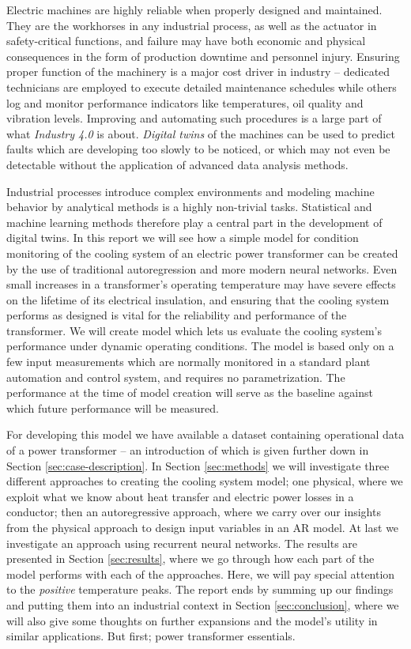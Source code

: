 \documentclass[]{article}
\begin{document}

Electric machines are highly reliable when properly designed and maintained. They are the workhorses in any industrial process, as well as the actuator in safety-critical functions, and failure may have both economic and physical consequences in the form of production downtime and personnel injury. Ensuring proper function of the machinery is a major cost driver in industry -- dedicated technicians are employed to execute detailed maintenance schedules while others log and monitor performance indicators like temperatures, oil quality and vibration levels. Improving and automating such procedures is a large part of what \textit{Industry 4.0} is about. \textit{Digital twins} of the machines can be used to predict faults which are developing too slowly to be noticed, or which may not even be detectable without the application of advanced data analysis methods. 

Industrial processes introduce complex environments and modeling machine behavior by analytical methods is a highly non-trivial tasks. Statistical and machine learning methods therefore play a central part in the development of digital twins. In this report we will see how a simple model for condition monitoring of the cooling system of an electric power transformer can be created by the use of traditional autoregression and more modern neural networks. Even small increases in a transformer's operating temperature may have severe effects on the lifetime of its electrical insulation, and ensuring that the cooling system performs as designed is vital for the reliability and performance of the transformer. We will create model which lets us evaluate the cooling system's performance under dynamic operating conditions. The model is based only on a few input measurements which are normally monitored in a standard plant automation and control system, and requires no parametrization. The performance at the time of model creation will serve as the baseline against which future performance will be measured.

For developing this model we have available a dataset containing operational data of a power transformer -- an introduction of which is given further down in Section \ref{sec:case-description}. In Section \ref{sec:methods} we will investigate three different approaches to creating the cooling system model; one physical, where we exploit what we know about heat transfer and electric power losses in a conductor; then an autoregressive approach, where we carry over our insights from the physical approach to design input variables in an AR model. At last we investigate an approach using recurrent neural networks. The results are presented in Section \ref{sec:results}, where we go through how each part of the model performs with each of the approaches. Here, we will pay special attention to the \textit{positive} temperature peaks. The report ends by summing up our findings and putting them into an industrial context in Section \ref{sec:conclusion}, where we will also give some thoughts on further expansions and the model's utility in similar applications. But first; power transformer essentials.
\end{document}
